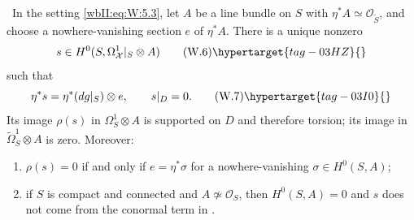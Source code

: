 \begin{theorem}
\hypertarget{tag-03IK}{}\label{wbII:prop:conductor}
\label{wbII:prop:conductor-differential}
\ In the setting \eqref{wbII:eq:W:5.3}, let $A$ be a line bundle on $S$ with
$\eta^*A\simeq\mathcal O_{\widetilde S}$, and choose a nowhere-vanishing
section $e$ of $\eta^*A$.  There is a unique nonzero
\[
s\in H^0(S,\Omega^1_{\mathcal X}|_S\otimes A)
\tag{W.6}\hypertarget{tag-03HZ}{}\label{wbII:eq:W:5.6}
\]
such that
\[
\eta^*s=\eta^*(dg|_S)\otimes e,\qquad s|_D=0.
\tag{W.7}\hypertarget{tag-03I0}{}\label{wbII:eq:W:5.7}
\]
Its image $\rho(s)$ in $\Omega^1_S\otimes A$ is supported on $D$ and
therefore torsion; its image in
$\widetilde\Omega^1_S\otimes A$ is zero.  Moreover:
\begin{enumerate}[label=(\alph*)]
\item $\rho(s)=0$ if and only if $e=\eta^*\sigma$ for a nowhere-vanishing
$\sigma\in H^0(S,A)$;
\item if $S$ is compact and connected and $A\not\simeq\mathcal O_S$, then
$H^0(S,A)=0$ and $s$ does not come from the conormal term in .
\end{enumerate}
\end{theorem}




